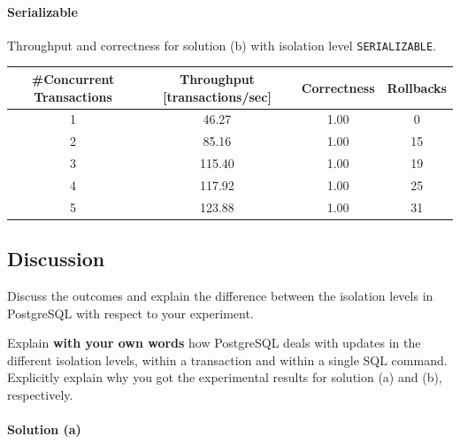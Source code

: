 \documentclass[11pt]{scrartcl}
\begin{document}
\paragraph{Serializable}

Throughput and correctness for solution (b) with isolation level \lstinline[style=dbtsql]{SERIALIZABLE}.

\begin{table}[H]
  \centering
  \begin{tabular}{c|c|c|c}
    \#Concurrent Transactions & Throughput [transactions/sec] & Correctness & Rollbacks
      \tabularnewline
    \hline
    1 & 46.27 & 1.00 & 0 \tabularnewline
    2 & 85.16 & 1.00 & 15 \tabularnewline
    3 & 115.40 & 1.00 & 19 \tabularnewline
    4 & 117.92 & 1.00 & 25 \tabularnewline
    5 & 123.88 & 1.00 & 31 \tabularnewline
  \end{tabular}
\end{table}

\subsection*{Discussion}

Discuss the outcomes and explain the difference between the isolation levels in PostgreSQL with respect to your experiment.

Explain \textbf{with your own words} how PostgreSQL deals with updates in the different isolation levels, within a transaction and within a single SQL command. Explicitly explain why you got the experimental results for solution (a) and (b), respectively.

\paragraph{Solution (a)}\mbox{}
\end{document}
